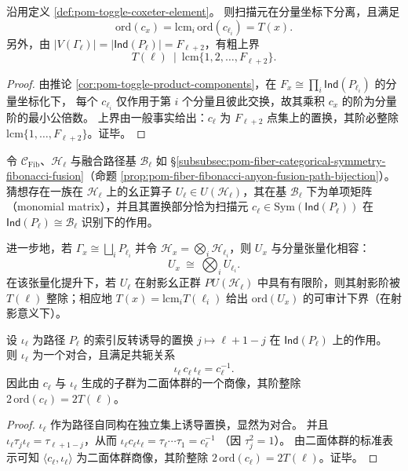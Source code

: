\begin{theorem}\label{thm:pom-toggle-coxeter-order-bound}
沿用定义 \ref{def:pom-toggle-coxeter-element}。
则扫描元在分量坐标下分离，且满足
\[
\mathrm{ord}(c_x)=\mathrm{lcm}_{i}\,\mathrm{ord}(c_{\ell_i})=T(x).
\]
\noindent 另外，由 \(|V(\Gamma_\ell)|=|\mathsf{Ind}(P_\ell)|=F_{\ell+2}\)，有粗上界
\[
T(\ell)\ \mid\ \mathrm{lcm}\{1,2,\dots,F_{\ell+2}\}.
\]
\end{theorem}
\begin{proof}
由推论 \ref{cor:pom-toggle-product-components}，在 \(F_x\cong \prod_i \mathsf{Ind}(P_{\ell_i})\) 的分量坐标化下，
每个 \(c_{\ell_i}\) 仅作用于第 \(i\) 个分量且彼此交换，故其乘积 \(c_x\) 的阶为分量阶的最小公倍数。
上界由一般事实给出：\(c_\ell\) 为 \(F_{\ell+2}\) 点集上的置换，其阶必整除 \(\mathrm{lcm}\{1,\dots,F_{\ell+2}\}\)。证毕。
\end{proof}



\begin{conjecture}\label{conj:pom-toggle-fusion-uplift-unitary-defect}
令 \(\mathcal C_{\mathrm{Fib}}\)、\(\mathcal H_\ell\) 与融合路径基 \(\mathcal B_\ell\) 如 \S\ref{subsubsec:pom-fiber-categorical-symmetry-fibonacci-fusion}（命题 \ref{prop:pom-fiber-fibonacci-anyon-fusion-path-bijection}）。
猜想存在一族在 \(\mathcal H_\ell\) 上的幺正算子 \(U_\ell\in U(\mathcal H_\ell)\)，其在基 \(\mathcal B_\ell\) 下为单项矩阵（monomial matrix），并且其置换部分恰为扫描元 \(c_\ell\in\mathrm{Sym}(\mathsf{Ind}(P_\ell))\) 在 \(\mathsf{Ind}(P_\ell)\cong \mathcal B_\ell\) 识别下的作用。
\par
进一步地，若 \(\Gamma_x\cong\bigsqcup_i P_{\ell_i}\) 并令 \(\mathcal H_x=\bigotimes_i\mathcal H_{\ell_i}\)，则 \(U_x\) 与分量张量化相容：
\[
U_x\ \cong\ \bigotimes_i U_{\ell_i}.
\]
在该张量化提升下，若 \(U_\ell\) 在射影幺正群 \(PU(\mathcal H_\ell)\) 中具有有限阶，则其射影阶被 \(T(\ell)\) 整除；相应地 \(T(x)=\mathrm{lcm}_iT(\ell_i)\) 给出 \(\mathrm{ord}(U_x)\) 的可审计下界（在射影意义下）。
\end{conjecture}

\begin{corollary}[时间反演的二面体核]\label{cor:pom-toggle-dihedral-time-reversal}
设 \(\iota_{\ell}\) 为路径 \(P_{\ell}\) 的索引反转诱导的置换 \(j\mapsto \ell+1-j\) 在 \(\mathsf{Ind}(P_\ell)\) 上的作用。
则 \(\iota_{\ell}\) 为一个对合，且满足共轭关系
\[
\iota_{\ell}\,c_{\ell}\,\iota_{\ell}=c_{\ell}^{-1}.
\]
因此由 \(c_\ell\) 与 \(\iota_\ell\) 生成的子群为二面体群的一个商像，其阶整除 \(2\,\mathrm{ord}(c_\ell)=2T(\ell)\)。
\end{corollary}
\begin{proof}
\(\iota_\ell\) 作为路径自同构在独立集上诱导置换，显然为对合。
并且 \(\iota_\ell\tau_j\iota_\ell=\tau_{\ell+1-j}\)，从而
\(
\iota_\ell c_\ell \iota_\ell
=\tau_\ell\cdots\tau_1
=c_\ell^{-1}
\)
（因 \(\tau_j^2=1\)）。
由二面体群的标准表示可知 \(\langle c_\ell,\iota_\ell\rangle\) 为二面体群商像，其阶整除 \(2\,\mathrm{ord}(c_\ell)=2T(\ell)\)。证毕。
\end{proof}

